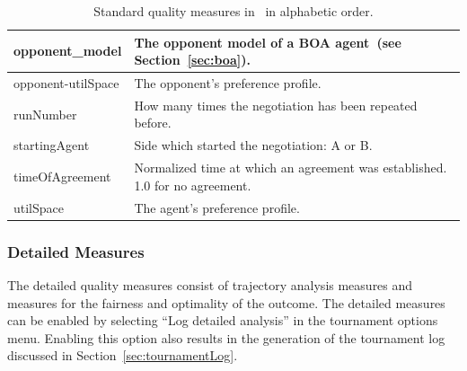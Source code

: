 \documentclass[]{article}
\begin{document}
\begin{table}[h!]
\begin{tabular}{|p{4.7cm}|p{9.2cm}|}
		opponent\_model & The opponent model of a BOA agent~(see Section~\ref{sec:boa}). \\[-0.3ex]\hline
		opponent-utilSpace & The opponent's preference profile.\\[-0.3ex]\hline
		runNumber & How many times the negotiation has been repeated before.\\[-0.3ex]\hline
		startingAgent & Side which started the negotiation: A or B.\\[-0.3ex]\hline
		timeOfAgreement & Normalized time at which an agreement was established. 1.0 for no agreement. \\[-0.3ex]\hline
		utilSpace & The agent's preference profile.\\[-0.3ex]
		\hline
		\hline
	\end{tabular}
	\caption{Standard quality measures in \Genius~in alphabetic order.}
	\label{tab:standardmeasures}
\end{table}

\subsubsection{Detailed Measures}\label{sec:detailedmeasures}
The detailed quality measures consist of trajectory analysis measures and measures for the fairness and optimality of the outcome. The detailed measures can be enabled by selecting ``Log detailed analysis'' in the tournament options menu. Enabling this option also results in the generation of the tournament log discussed in Section~\ref{sec:tournamentLog}.
\end{document}
